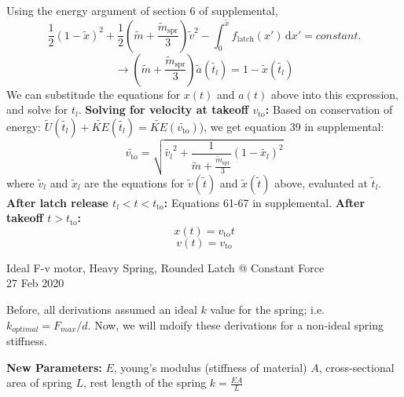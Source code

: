 \documentclass[12pt]{article}
\begin{document}
Using the energy argument of section 6 of supplemental,
\[
    \frac{1}{2}(1-\tilde{x})^2 + \frac{1}{2}\left(\tilde{m} + \frac{\tilde{m}_{\text{spr}}}{3} \right)\tilde{v}^2 - \int_0^{\tilde{x}} \! f_{\text{latch}}(x') \, \mathrm{d}x' = constant. 
\]
\[
    \rightarrow \left(\tilde{m} + \frac{\tilde{m}_{\text{spr}}}{3} \right)\tilde{a}(\tilde{t_l}) = 1 - \tilde{x}(\tilde{t_l})
\]
We can substitude the equations for $x(t)$ and $a(t)$ above into this expression, and solve for $t_l$.
\newline 
\newline
\noindent \textbf{Solving for velocity at takeoff $v_{\text{to}}$:}
\newline
Based on conservation of energy: $\tilde{U}(\tilde{t_l}) + \tilde{KE}(\tilde{t_l}) = \tilde{KE}(\tilde{v_{\text{to}}})$), we get equation 39 in supplemental:
\[
    \tilde{v_{\text{to}}} = \sqrt{\tilde{v_l}^2 + \frac{1}{\tilde{m} + \frac{\tilde{m}_{\text{spr}}}{3}} (1 - \tilde{x_l})^2}
\]
where $\tilde{v}_l$ and $\tilde{x}_l$ are the equations for $\tilde{v}(\tilde{t})$ and $\tilde{x}(\tilde{t})$ above, evaluated at $\tilde{t}_l$.
\newline 
\newline
\noindent \textbf{After latch release $t_l < t < t_{\text{to}}$:}
\newline
Equations 61-67 in supplemental.
\newline
\newline
\noindent \textbf{After takeoff $t > t_{\text{to}}$:}
\[
    x(t) = v_{\text{to}}t
\]
\[
    v(t) = v_{\text{to}}
\]

\newpage
\begin{center}
    Ideal F-v motor, Heavy Spring, Rounded Latch @ Constant Force \\
    27 Feb 2020
\end{center}

\noindent
Before, all derivations assumed an ideal $k$ value for the spring; i.e. $k_{optimal} = F_{max} / d$. Now, we will mdoify these derivations for a non-ideal spring stiffness. \newline

\noindent \textbf{New Parameters:}
\newline
$E$, young's modulus (stiffness of material) \newline
$A$, cross-sectional area of spring \newline
$L$, rest length of the spring \newline
$k = \frac{EA}{L}$ \newline
\end{document}
